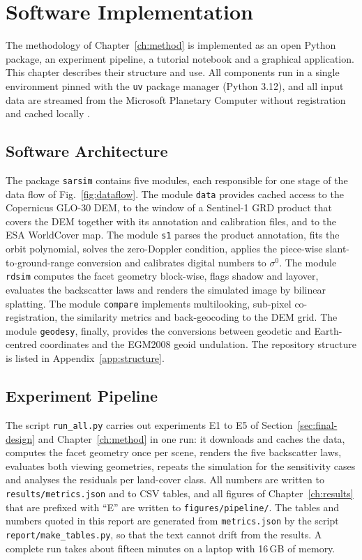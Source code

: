 \chapter{Software Implementation}
\label{ch:software}
The methodology of Chapter~\ref{ch:method} is implemented as an open Python package, an experiment pipeline, a
tutorial notebook and a graphical application. This chapter describes their structure and use. All components run in a
single environment pinned with the \texttt{uv} package manager (Python 3.12), and all input data are streamed from the
Microsoft Planetary Computer without registration and cached locally \cite{planetary}.

\section{Software Architecture}
The package \texttt{sarsim} contains five modules, each responsible for one stage of the data flow of
Fig.~\ref{fig:dataflow}. The module \texttt{data} provides cached access to the Copernicus GLO-30 DEM, to the window of
a Sentinel-1 GRD product that covers the DEM together with its annotation and calibration files, and to the ESA
WorldCover map. The module \texttt{s1} parses the product annotation, fits the orbit polynomial, solves the
zero-Doppler condition, applies the piece-wise slant-to-ground-range conversion and calibrates digital numbers to
$\sigma^0$. The module \texttt{rdsim} computes the facet geometry block-wise, flags shadow and layover, evaluates the
backscatter laws and renders the simulated image by bilinear splatting. The module \texttt{compare} implements
multilooking, sub-pixel co-registration, the similarity metrics and back-geocoding to the DEM grid. The module
\texttt{geodesy}, finally, provides the conversions between geodetic and Earth-centred coordinates and the EGM2008
geoid undulation. The repository structure is listed in Appendix~\ref{app:structure}.

\section{Experiment Pipeline}
The script \texttt{run\_all.py} carries out experiments E1 to E5 of Section~\ref{sec:final-design} and
Chapter~\ref{ch:method} in one run: it downloads and caches the data, computes the facet geometry once per scene,
renders the five backscatter laws, evaluates both viewing geometries, repeats the simulation for the sensitivity
cases and analyses the residuals per land-cover class. All numbers are written to \texttt{results/metrics.json} and to
CSV tables, and all figures of Chapter~\ref{ch:results} that are prefixed with ``E'' are written to
\texttt{figures/pipeline/}. The tables and numbers quoted in this report are generated from \texttt{metrics.json} by
the script \texttt{report/make\_tables.py}, so that the text cannot drift from the results. A complete run takes about
fifteen minutes on a laptop with 16\,GB of memory.

